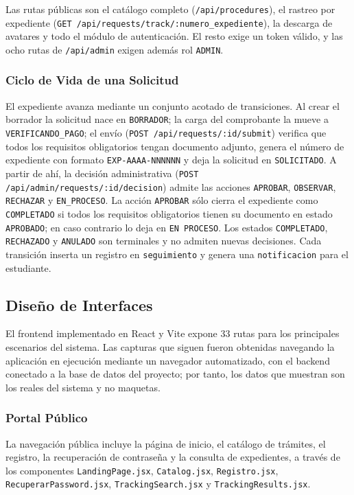 Las rutas públicas son el catálogo completo (\texttt{/api/procedures}), el
rastreo por expediente (\texttt{GET /api/requests/track/:numero\_expediente}),
la descarga de avatares y todo el módulo de autenticación. El resto exige un
token válido, y las ocho rutas de \texttt{/api/admin} exigen además rol
\texttt{ADMIN}.

\subsubsection{Ciclo de Vida de una Solicitud}
El expediente avanza mediante un conjunto acotado de transiciones. Al crear
el borrador la solicitud nace en \texttt{BORRADOR}; la carga del comprobante
la mueve a \texttt{VERIFICANDO\_PAGO}; el envío
(\texttt{POST /api/requests/:id/submit}) verifica que todos los requisitos
obligatorios tengan documento adjunto, genera el número de expediente con
formato \texttt{EXP-AAAA-NNNNNN} y deja la solicitud en \texttt{SOLICITADO}.
A partir de ahí, la decisión administrativa
(\texttt{POST /api/admin/requests/:id/decision}) admite las acciones
\texttt{APROBAR}, \texttt{OBSERVAR}, \texttt{RECHAZAR} y \texttt{EN\_PROCESO}.
La acción \texttt{APROBAR} sólo cierra el expediente como \texttt{COMPLETADO}
si todos los requisitos obligatorios tienen su documento en estado
\texttt{APROBADO}; en caso contrario lo deja en \texttt{EN PROCESO}. Los
estados \texttt{COMPLETADO}, \texttt{RECHAZADO} y \texttt{ANULADO} son
terminales y no admiten nuevas decisiones. Cada transición inserta un registro
en \texttt{seguimiento} y genera una \texttt{notificacion} para el estudiante.

\subsection{Diseño de Interfaces}
El frontend implementado en React y Vite expone 33 rutas para los principales
escenarios del sistema. Las capturas que siguen fueron obtenidas navegando la
aplicación en ejecución mediante un navegador automatizado, con el backend
conectado a la base de datos del proyecto; por tanto, los datos que muestran
son los reales del sistema y no maquetas.

\subsubsection{Portal Público}
La navegación pública incluye la página de inicio, el catálogo de trámites,
el registro, la recuperación de contraseña y la consulta de expedientes, a
través de los componentes \texttt{LandingPage.jsx}, \texttt{Catalog.jsx},
\texttt{Registro.jsx}, \texttt{RecuperarPassword.jsx},
\texttt{TrackingSearch.jsx} y \texttt{TrackingResults.jsx}.

